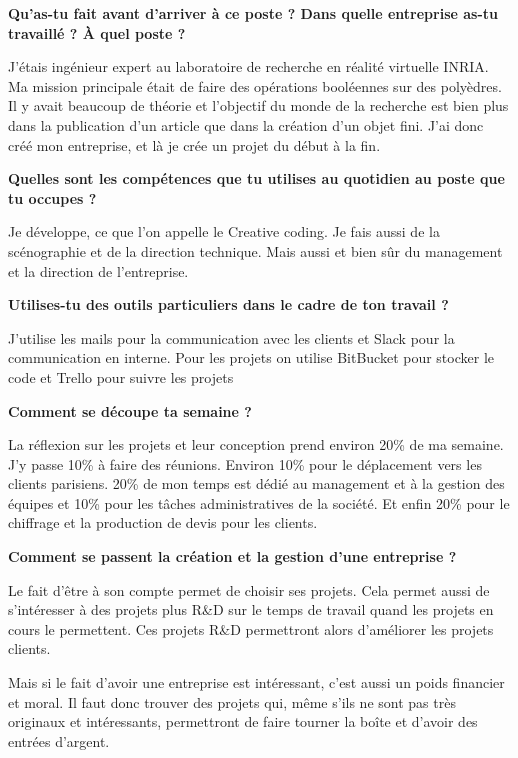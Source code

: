 \documentclass{article}
\newcommand{\question}[1]{\medskip\noindent\textbf{#1}\medskip}
\begin{document}
    \question{Qu'as-tu fait avant d'arriver à ce poste ? Dans quelle entreprise as-tu travaillé ? À quel poste ?}

    J'étais ingénieur expert au laboratoire de recherche en réalité virtuelle INRIA.
    Ma mission principale était de faire des opérations booléennes sur des polyèdres.
    Il y avait beaucoup de théorie et l'objectif du monde de la recherche est bien plus dans la publication d'un article que dans la création d'un objet fini.
    J'ai donc créé mon entreprise, et là je crée un projet du début à la fin.

    \question{Quelles sont les compétences que tu utilises au quotidien au poste que tu occupes ?}

    Je développe, ce que l'on appelle le Creative coding.
    Je fais aussi de la scénographie et de la direction technique.
    Mais aussi et bien sûr du management et la direction de l'entreprise.

    \question{Utilises-tu des outils particuliers dans le cadre de ton travail ?}

    J'utilise les mails pour la communication avec les clients et Slack pour la communication en interne.
    Pour les projets on utilise BitBucket pour stocker le code et Trello pour suivre les projets

    \question{Comment se découpe ta semaine ?}

    La réflexion sur les projets et leur conception prend environ 20\% de ma semaine.
    J'y passe 10\% à faire des réunions.
    Environ 10\% pour le déplacement vers les clients parisiens.
    20\% de mon temps est dédié au management et à la gestion des équipes et 10\% pour les tâches administratives de la société.
    Et enfin 20\% pour le chiffrage et la production de devis pour les clients.

    \question{Comment se passent la création et la gestion d'une entreprise ?}

    Le fait d'être à son compte permet de choisir ses projets.
    Cela permet aussi de s'intéresser à des projets plus R\&D sur le temps de travail quand les projets en cours le permettent.
    Ces projets R\&D permettront alors d'améliorer les projets clients.

    Mais si le fait d'avoir une entreprise est intéressant, c'est aussi un poids financier et moral.
    Il faut donc trouver des projets qui, même s'ils ne sont pas très originaux et intéressants, permettront de faire tourner la boîte et d'avoir des entrées d'argent.
\end{document}
